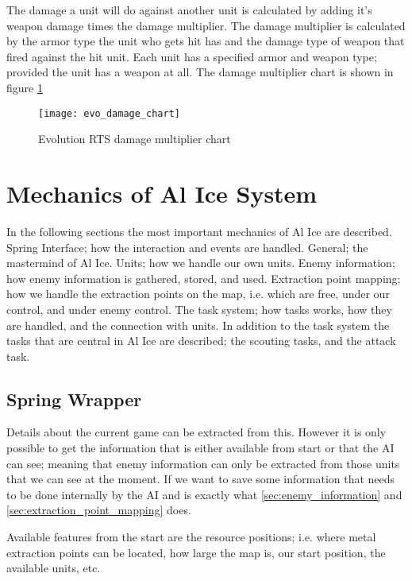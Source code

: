 The damage a unit will do against another unit is calculated by adding it's weapon damage times the
damage multiplier. The damage multiplier is calculated by the armor type the unit who gets hit has
and the damage type of weapon that fired against the hit unit. Each unit has a specified armor and
weapon type; provided the unit has a weapon at all. The damage multiplier chart is shown in figure
\ref{fig:damage_multiplier_chart}
\begin{figure}[tb]
\centering
\caption{Evolution RTS damage multiplier chart}
\label{fig:damage_multiplier_chart}
\texttt{[image: evo\_damage\_chart]}
\end{figure}

\section{Mechanics of Al Ice System}
In the following sections the most important mechanics of Al Ice are described.
Spring Interface; how the interaction and events are handled.
General; the mastermind of Al Ice.
Units; how we handle our own units.
Enemy information; how enemy information is gathered, stored, and used. 
Extraction point mapping; how we handle the extraction points on the map, i.e. which are free, under
our control, and under enemy control.
The task system; how tasks works, how they are handled, and the connection with units. In
addition to the task system the tasks that are central in Al Ice are described; the scouting tasks,
and the attack task.

\subsection{Spring Wrapper}
Details about the current game can be extracted from this. However it is only possible to get the
information that is either available from start or that the AI can see; meaning that enemy
information can only be extracted from those units that we can see at the moment. If we want to save
some information that needs to be done internally by the AI and is exactly what
\ref{sec:enemy_information}  and \ref{sec:extraction_point_mapping}
 does.

Available features from the start are the resource positions; i.e. where metal extraction points can
be located, how large the map is, our start position, the available units, etc.

